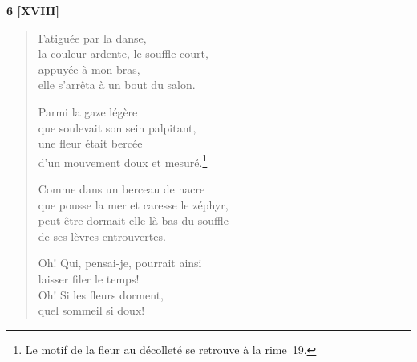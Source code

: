 \bigskip



\begin{center}
  \textbf{6 [XVIII]}
\end{center}

\begin{verse}
  Fatiguée par la danse, \\
  la couleur ardente, le souffle court, \\
  appuyée à mon bras, \\
  elle s'arrêta à un bout du salon.

  Parmi la gaze légère \\
  que soulevait son sein palpitant, \\
  une fleur était bercée \\
  d'un mouvement doux et mesuré.\footnote{Le motif de la fleur au
  décolleté se retrouve à la rime~19.}

  Comme dans un berceau de nacre \\
  que pousse la mer et caresse le zéphyr, \\
  peut-être dormait-elle là-bas du souffle \\
  de ses lèvres entrouvertes.

  Oh! Qui, pensai-je, pourrait ainsi \\
  laisser filer le temps! \\
  Oh! Si les fleurs dorment, \\
  quel sommeil si doux!
\end{verse}




